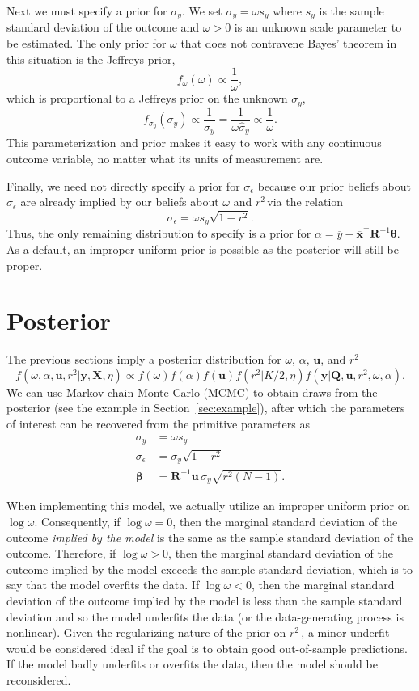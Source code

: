 \documentclass[11pt]{article}
\newcommand{\Rsq}{$r^2\,$}
\newcommand{\boldbeta}{\boldsymbol{\beta}}
\newcommand{\boldtheta}{\boldsymbol{\theta}}
\newcommand{\sigmaEps}{\sigma_{\epsilon}}
\newcommand{\X}{\mathbf{X}}
\newcommand{\y}{\mathbf{y}}
\newcommand{\Q}{\mathbf{Q}}
\newcommand{\R}{\mathbf{R}}
\renewcommand{\u}{\mathbf{u}}
\begin{document}
Next we must specify a prior for $\sigma_y$. We set $\sigma_y = \omega s_y$
where $s_y$ is the sample standard deviation of the outcome and $\omega > 0$ is
an unknown scale parameter to be estimated. The only prior for $\omega$ that
does not contravene Bayes' theorem in this situation is the Jeffreys prior,
$$f_\omega \left(\omega\right) \propto \frac{1}{\omega},$$
which is proportional to a Jeffreys prior on the unknown $\sigma_y$,
$$f_{\sigma_y} \left(\sigma_y\right) \propto \frac{1}{\sigma_y}
= \frac{1}{\omega \widehat{\sigma}_y} \propto \frac{1}{\omega}.$$
This parameterization and prior makes it easy to work with any continuous
outcome variable, no matter what its units of measurement are.

Finally, we need not directly specify a prior for $\sigmaEps$ because our prior
beliefs about $\sigmaEps$ are already implied by our beliefs about $\omega$ and
\Rsq via the relation
$$\sigmaEps = \omega s_y \sqrt{1 - r^2}.$$
Thus, the only remaining distribution to specify is a prior for
$\alpha = \overline{y} - \overline{\mathbf{x}}^\top \R^{-1} \boldtheta$.
As a default, an improper uniform prior is possible as the posterior will still
be proper.


\section{Posterior}
\label{sec:posterior}

The previous sections imply a posterior distribution for $\omega$, $\alpha$,
$\u$, and \Rsq
%
$$f(\omega, \alpha, \u, r^2 | \y, \X, \eta) \propto
f(\omega) f(\alpha) f(\u) f(r^2 | K / 2, \eta)
f(\y | \Q, \u, r^2, \omega, \alpha).$$
%
We can use Markov chain Monte Carlo (MCMC) to obtain draws from the posterior
(see the example in Section~\ref{sec:example}), after which the parameters of
interest can be recovered from the primitive parameters as
%
\begin{align*}
\sigma_y &= \omega s_y \\
\sigmaEps &= \sigma_y \sqrt{1 - r^2} \\
\boldbeta &= \R^{-1} \u \, \sigma_y \sqrt{r^2 \left(N-1\right)}.
\end{align*}

When implementing this model, we actually utilize an improper uniform prior on
$\log{\omega}$. Consequently, if $\log{\omega} = 0$, then the marginal standard
deviation of the outcome \emph{implied by the model} is the same as the sample
standard deviation of the outcome. Therefore, if $\log{\omega} > 0$, then the
marginal standard deviation of the outcome implied by the model exceeds the
sample standard deviation, which is to say that the model overfits the data. If
$\log{\omega} < 0$, then the marginal standard deviation of the outcome implied
by the model is less than the sample standard deviation and so the model
underfits the data (or the data-generating process is nonlinear). Given the
regularizing nature of the prior on \Rsq, a minor underfit would be considered
ideal if the goal is to obtain good out-of-sample predictions. If the model
badly underfits or overfits the data, then the model should be reconsidered.
\end{document}
